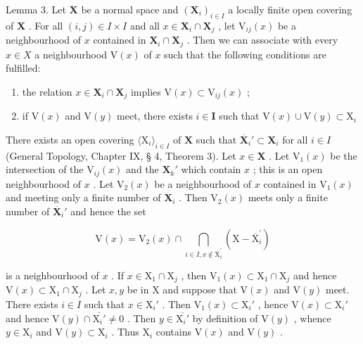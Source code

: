 Lemma 3. Let \(\mathbf{X}\) be a normal space and \((\mathbf{X}_i)_{i\in I}\) a locally finite open covering of \(\mathbf{X}\) . For all \((i,j)\in I\times I\) and all \(x\in \mathbf{X}_i\cap \mathbf{X}_j\) , let \(\mathrm{V}_{ij}(x)\) be a neighbourhood of \(x\) contained in \(\mathbf{X}_i\cap \mathbf{X}_j\) . Then we can associate with every \(x\in X\) a neighbourhood \(\mathrm{V}(x)\) of \(x\) such that the following conditions are fulfilled:

\begin{enumerate}
\def\labelenumi{(\alph{enumi})}
\item
  the relation \(x \in \mathbf{X}_i \cap \mathbf{X}_j\) implies \(\mathrm{V}(x) \subset \mathrm{V}_{ij}(x)\) ;
\item
  if \(\mathrm{V}(x)\) and \(\mathrm{V}(y)\) meet, there exists \(i\in \mathbf{I}\) such that \(\mathrm{V}(x)\cup \mathrm{V}(y)\subset \mathrm{X}_i\)
\end{enumerate}

There exists an open covering \(\langle \mathrm{X}_i\rangle_{i\in I}\) of \(\mathbf{X}\) such that \(\overline{\mathbf{X}}_i' \subset \mathbf{X}_i\) for all \(i \in I\) (General Topology, Chapter IX, § 4, Theorem 3). Let \(x \in \mathbf{X}\) . Let \(\mathrm{V}_1(x)\) be the intersection of the \(\mathrm{V}_{ij}(x)\) and the \(\mathbf{X}_k'\) which contain \(x\) ; this is an open neighbourhood of \(x\) . Let \(\mathrm{V}_2(x)\) be a neighbourhood of \(x\) contained in \(\mathrm{V}_1(x)\) and meeting only a finite number of \(\mathbf{X}_i\) . Then \(\mathrm{V}_2(x)\) meets only a finite number of \(\overline{\mathbf{X}}_i'\) and hence the set

\[
\mathrm{V} (x) = \mathrm{V} _ {2} (x) \cap \bigcap_ {i \in I, x \notin \overline {{\mathrm{X}}} _ {i} ^ {\prime}} (\mathrm{X} - \overline {{\mathrm{X}}} _ {i} ^ {\prime})
\]

is a neighbourhood of \(x\) . If \(x \in \mathrm{X}_1 \cap \mathrm{X}_j\) , then \(\mathrm{V}_1(x) \subset \mathrm{X}_1 \cap \mathrm{X}_j\) and hence \(\mathrm{V}(x) \subset \mathrm{X}_1 \cap \mathrm{X}_j\) . Let \(x, y\) be in \(\mathrm{X}\) and suppose that \(\mathrm{V}(x)\) and \(\mathrm{V}(y)\) meet. There exists \(i \in I\) such that \(x \in \mathrm{X}_i'\) . Then \(\mathrm{V}_1(x) \subset \mathrm{X}_i'\) , hence \(\mathrm{V}(x) \subset \mathrm{X}_i'\) and hence \(\mathrm{V}(y) \cap \overline{\mathrm{X}_i'} \neq 0\) . Then \(y \in \overline{\mathrm{X}_i'}\) by definition of \(\mathrm{V}(y)\) , whence \(y \in \mathrm{X}_i\) and \(\mathrm{V}(y) \subset \mathrm{X}_i\) . Thus \(\mathrm{X}_i\) contains \(\mathrm{V}(x)\) and \(\mathrm{V}(y)\) .

